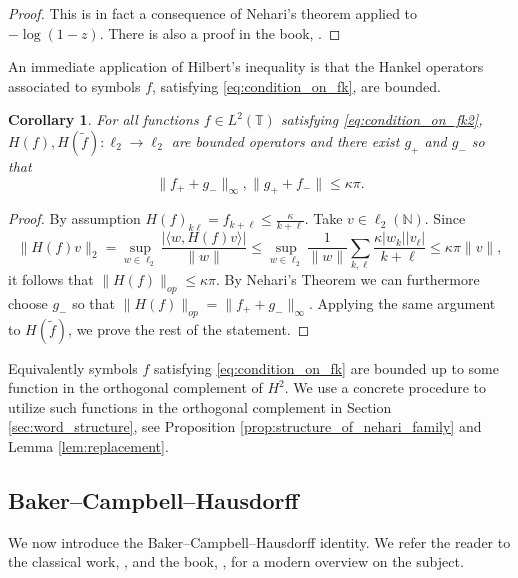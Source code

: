 \documentclass[11pt]{amsart}
\theoremstyle{plain}
\newtheorem{corollary}[theorem]{Corollary}
\theoremstyle{remark}
\numberwithin{equation}{section}
\begin{document}
\begin{proof}
This is in fact a consequence of Nehari's theorem applied to $-\log(1-z)$. There is also a proof in the book, \cite{HLP}. 
\end{proof}
An immediate application of Hilbert's inequality is that the Hankel operators associated to symbols $f$, satisfying \eqref{eq:condition_on_fk}, are bounded. 
\begin{corollary}\label{cor:bounded_completion}
For all functions $f\in L^2(\mathbb{T})$ satisfying \eqref{eq:condition_on_fk2}, $H(f), H(\widetilde{f}):\ell_2\rightarrow \ell_2$ are bounded operators and there exist $g_+$ and $g_-$ so that 
$$\|f_++g_-\|_{\infty}, \|g_++f_-\|\leq\kappa \pi.$$
\end{corollary}
\begin{proof}
By assumption $H(f)_{k\ell}=f_{k+\ell}\leq\frac{\kappa}{k+\ell}.$ Take $v\in\ell_2(\mathbb{N})$. Since 
\begin{equation}
\|H(f)v\|_{2}
=\sup_{w\in\ell_2}\frac{|\langle w,H(f)v\rangle |}{\|w\|}
\leq\sup_{w\in\ell_2}
    \frac{1}{\|w\|}\sum_{k,\ell}\frac{\kappa |w_k||v_\ell|}{k+\ell}
\leq \kappa\pi\|v\|,
\end{equation}
it follows that $\|H(f)\|_{op}\leq \kappa\pi$. By Nehari's Theorem we can furthermore choose $g_-$ so that $\|H(f)\|_{op}=\|f_++g_-\|_{\infty}$.
Applying the same argument to $H(\widetilde{f})$, we prove the rest of the statement.
\end{proof}

Equivalently symbols $f$ satisfying \eqref{eq:condition_on_fk} are bounded up to some function in the orthogonal complement of $H^2$. We use a concrete procedure to utilize such functions in the orthogonal complement in Section \ref{sec:word_structure}, see Proposition \ref{prop:structure_of_nehari_family} and Lemma \ref{lem:replacement}.





\subsection{Baker--Campbell--Hausdorff}\label{sec:bch}
We now introduce the Baker--Campbell--Hausdorff identity. We refer the reader to the classical work, \cite{Mag}, and the book, \cite{BonFul12}, for a modern overview on the subject.
\end{document}
